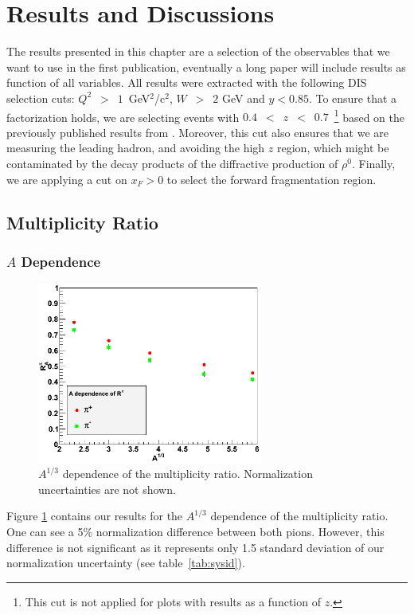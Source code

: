\section{Results and Discussions}
\label{chap:results}

The results presented in this chapter are a selection of the observables 
that we want to use in the first publication, eventually a long paper will
include results as function of all variables. All results were extracted with the following DIS selection cuts: 
$Q^2$~$>$~$1$~GeV$^2$/c$^2$, $W$~$>$~$2$ GeV and $y<0.85$. To ensure that a factorization holds, we are selecting events with $0.4$~$<$~$z$~$<$~$0.7$~\footnote{This cut is not applied for plots with results as a function of $z$.} based on the previously published results from \cite{Asaturyan:2011mq}. Moreover, this cut also ensures that we are measuring the leading hadron, and avoiding the high $z$ region, which might be contaminated by 
the decay products of the diffractive production of $\rho^0$. Finally, we are applying a cut on $x_F > 0$ to select the forward fragmentation region.

\subsection{Multiplicity Ratio}

\subsubsection{$A$ Dependence}
\label{sec:resA}

\begin{figure}[p]
\centering
\includegraphics[width=7.4cm] {chap6-fig/F_RvA.png} 
\caption {$A^{1/3}$ dependence of the multiplicity ratio. Normalization 
uncertainties are not shown.}
\label{fig:RA}
\end{figure}

Figure \ref{fig:RA} contains our results for the $A^{1/3}$ dependence of 
the multiplicity ratio. One can see a 5\% normalization difference between both pions. However, this difference is not significant as it represents only 1.5 
standard deviation of our normalization uncertainty (see table~\ref{tab:sysid}).

